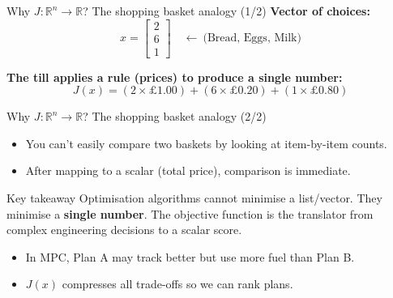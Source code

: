 \documentclass[aspectratio=169,10pt]{beamer}
\newcommand{\R}{\mathbb{R}}
\begin{document}
\begin{frame}{Why $J:\R^n\to \R$? The shopping basket analogy (1/2)}
\textbf{Vector of choices:}
\begin{equation*}
x=\begin{bmatrix}2\\6\\1\end{bmatrix}
\quad\leftarrow\ \text{(Bread, Eggs, Milk)}
\end{equation*}

\textbf{The till applies a rule (prices) to produce a single number:}
\begin{equation*}
J(x)=(2\times \pounds 1.00) + (6\times \pounds 0.20) + (1\times \pounds 0.80)
\end{equation*}

\begin{center}
\end{center}
\end{frame}

\begin{frame}{Why $J:\R^n\to \R$? The shopping basket analogy (2/2)}
\begin{itemize}
  \item You can't easily compare two baskets by looking at item-by-item counts.
  \item After mapping to a scalar (total price), comparison is immediate.
\end{itemize}

\begin{notebox}{Key takeaway}
Optimisation algorithms cannot minimise a list/vector. They minimise a \textbf{single number}.
The objective function is the translator from complex engineering decisions to a scalar score.
\end{notebox}

\begin{itemize}
  \item In MPC, Plan A may track better but use more fuel than Plan B.
  \item $J(x)$ compresses all trade-offs so we can rank plans.
\end{itemize}
\end{frame}
\end{document}
